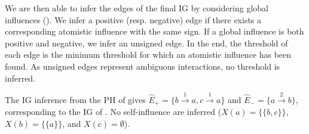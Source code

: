 We are then able to infer the edges of the final IG by considering global influences ().
We infer a positive (resp. negative) edge if there exists a corresponding atomistic influence with the same
sign. If a global influence is both positive and negative, we infer an unsigned edge. In the end, the
threshold of each edge is the minimum threshold for which an atomistic influence has been found. As unsigned
edges represent ambiguous interactions, no threshold is inferred.

\begin{example*}
The IG inference from the PH of  gives
$\hat{E}_+ = \{b \xrightarrow{1} a, c \xrightarrow{1} a\}$ and 
$\hat{E}_- = \{a \xrightarrow{2} b\}$, corresponding to the IG of .
No self-influence are inferred ($X(a) = \{ \{b,c\} \}$, $X(b)=\{ \{a\}\}$, and $X(c)=\emptyset$).
\end{example*}
